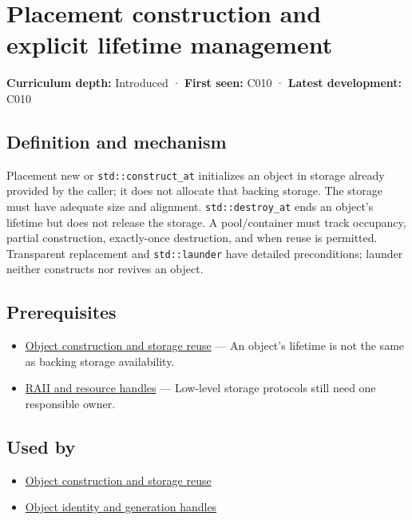 \hypertarget{appendix-f56c3e43fd4e}{}\label{referencestart:appendix-f56c3e43fd4e}
\section{Placement construction and explicit lifetime management}\label{appendix-f56c3e43fd4e-placement-construction-and-explicit-lifetime-management}

\textbf{Curriculum depth:} Introduced · \textbf{First seen:} C010 · \textbf{Latest development:} C010

\subsection{Definition and mechanism}\label{appendix-f56c3e43fd4e-definition-and-mechanism}

Placement new or \texttt{std::construct\_at} initializes an object in storage already provided by the caller; it does not allocate that backing storage. The storage must have adequate size and alignment. \texttt{std::destroy\_at} ends an object's lifetime but does not release the storage. A pool/container must track occupancy, partial construction, exactly-once destruction, and when reuse is permitted. Transparent replacement and \texttt{std::launder} have detailed preconditions; launder neither constructs nor revives an object.

\subsection{Prerequisites}\label{appendix-f56c3e43fd4e-prerequisites}

\begin{itemize}
\tightlist
\item
  \hyperref[appendix-a82f9c438857]{Object construction and storage reuse} --- An object's lifetime is not the same as backing storage availability.
\item
  \hyperref[appendix-69739d3ab49b]{RAII and resource handles} --- Low-level storage protocols still need one responsible owner.
\end{itemize}

\subsection{Used by}\label{appendix-f56c3e43fd4e-used-by}

\begin{itemize}
\tightlist
\item
  \hyperref[appendix-a82f9c438857]{Object construction and storage reuse}
\item
  \hyperref[appendix-f1581457d322]{Object identity and generation handles}
\end{itemize}

